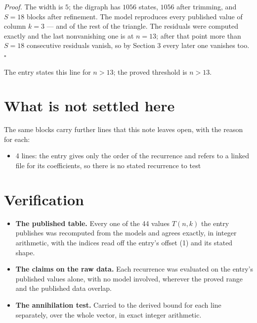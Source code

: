 \documentclass[11pt]{article}
\theoremstyle{definition}
\begin{document}
{\itshape Proof.} The width is $5$; the digraph has $1056$ states, $1056$ after trimming, and $S = 18$ blocks after refinement. The model reproduces every published value of column $k = 3$ --- and of the rest of the triangle. The residuals were computed exactly and the last nonvanishing one is at $n = 13$; after that point more than $S = 18$ consecutive residuals vanish, so by Section 3 every later one vanishes too. $\square$

The entry states this line for $n > 13$; the proved threshold is $n > 13$.

\section{What is not settled here}

The same blocks carry further lines that this note leaves open, with the reason for each:

\begin{itemize}

\item 4 lines: the entry gives only the order of the recurrence and refers to a linked file for its coefficients, so there is no stated recurrence to test

\end{itemize}

\section{Verification}

\begin{itemize}

\item {\bfseries The published table.} Every one of the 44 values $T(n,k)$ the entry publishes was recomputed from the models and agrees exactly, in integer arithmetic, with the indices read off the entry's offset (1) and its stated shape.

\item {\bfseries The claims on the raw data.} Each recurrence was evaluated on the entry's published values alone, with no model involved, wherever the proved range and the published data overlap.

\item {\bfseries The annihilation test.} Carried to the derived bound for each line separately, over the whole vector, in exact integer arithmetic.

\end{itemize}
\end{document}
